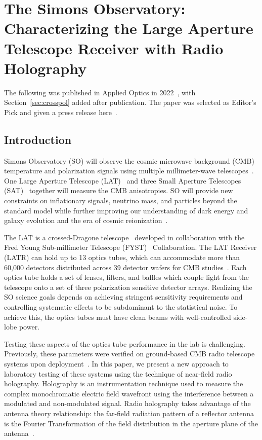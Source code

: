 \chapter{The Simons Observatory: Characterizing the Large Aperture Telescope Receiver with Radio Holography}
\label{ch:ot_holo}
The following was published in Applied Optics in 2022~\cite{chesmore2022}, with Section~\ref{sec:crosspol} added after publication.  The paper was selected as Editor's Pick and given a press release here~\cite{SOLATpress}.
\section{Introduction}

Simons Observatory (SO) will observe the cosmic microwave background (CMB) temperature and polarization signals using multiple millimeter-wave telescopes~\cite{gali18, so19}.  One Large Aperture Telescope (LAT)~\cite{Niemack:16, Gudmundsson:21,Parshley_2018} and three Small Aperture Telescopes (SAT)~\cite{ali20} together will measure the CMB anisotropies.  SO will provide new constraints on inflationary signals, neutrino mass, and particles beyond the standard model while further improving our understanding of dark energy and galaxy evolution and the era of cosmic reionization~\citep{so19}. 

The LAT is a crossed-Dragone telescope~\cite{6773968,Niemack:16,2021RNAAS...5..100X} developed in collaboration with the Fred Young Sub-millimeter Telescope (FYST)~\cite{ccat,aravena2019ccatprime} Collaboration.  The LAT Receiver (LATR) can hold up to 13 optics tubes, which can accommodate more than 60,000 detectors distributed across 39 detector wafers for CMB studies~\cite{Parshley_2018,zhu2021simons,mccarrick2021simons}.  Each optics tube holds a set of lenses, filters, and baffles which couple light from the telescope onto a set of three polarization sensitive detector arrays.   Realizing the SO science goals depends on achieving stringent sensitivity requirements and controlling systematic effects to be subdominant to the statistical noise.   To achieve this, the optics tubes must have clean beams with well-controlled side-lobe power.  

Testing these aspects of the optics tube performance in the lab is challenging.  Previously, these parameters were verified on ground-based CMB radio telescope systems upon deployment~\cite{alma_holog,2007A&A...465..679N}.  In this paper, we present a new approach to laboratory testing of these systems using the technique of near-field radio holography.  Holography is an instrumentation technique used to measure the complex monochromatic electric field wavefront using the interference between a modulated and non-modulated signal.  Radio holography takes advantage of the antenna theory relationship: the far-field radiation pattern of a reflector antenna is the Fourier Transformation of the field distribution in the aperture plane of the antenna~\cite{alma_holog}.

